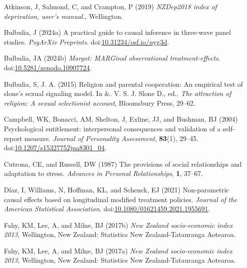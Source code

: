 \documentclass[
  singlecolumn]{article}
\newlength{\cslhangindent}
\newenvironment{CSLReferences}[2] %
 {\begin{list}{}{%
  \setlength{\itemindent}{0pt}
  \setlength{\leftmargin}{0pt}
  \setlength{\parsep}{0pt}
  \ifodd #1
   \setlength{\leftmargin}{\cslhangindent}
   \setlength{\itemindent}{-1\cslhangindent}
  \fi
  \setlength{\itemsep}{#2\baselineskip}}}
 {\end{list}}
\begin{document}
\label{refs}
\begin{CSLReferences}{1}{0}
Atkinson, J, Salmond, C, and Crampton, P (2019) \emph{NZDep2018 index of
deprivation, user{'}s manual.}, Wellington.

Bulbulia, J (2024a) A practical guide to causal inference in three-wave
panel studies. \emph{PsyArXiv Preprints}.
doi:\href{https://doi.org/10.31234/osf.io/uyg3d}{10.31234/osf.io/uyg3d}.

Bulbulia, JA (2024b) \emph{Margot: MARGinal observational
treatment-effects}.
doi:\href{https://doi.org/10.5281/zenodo.10907724}{10.5281/zenodo.10907724}.

Bulbulia, S, J. A. (2015) Religion and parental cooperation: An
empirical test of slone's sexual signaling model. In \&. V. S. J. Slone
D., ed., \emph{The attraction of religion: A sexual selectionist
account}, Bloomsbury Press, 29--62.

Campbell, WK, Bonacci, AM, Shelton, J, Exline, JJ, and Bushman, BJ
(2004) Psychological entitlement: interpersonal consequences and
validation of a self-report measure. \emph{Journal of Personality
Assessment}, \textbf{83}(1), 29--45.
doi:\href{https://doi.org/10.1207/s15327752jpa8301_04}{10.1207/s15327752jpa8301\_04}.

Cutrona, CE, and Russell, DW (1987) The provisions of social
relationships and adaptation to stress. \emph{Advances in Personal
Relationships}, \textbf{1}, 37--67.

Díaz, I, Williams, N, Hoffman, KL, and Schenck, EJ (2021) Non-parametric
causal effects based on longitudinal modified treatment policies.
\emph{Journal of the American Statistical Association}.
doi:\href{https://doi.org/10.1080/01621459.2021.1955691}{10.1080/01621459.2021.1955691}.

Fahy, KM, Lee, A, and Milne, BJ (2017b) \emph{New Zealand socio-economic
index 2013}, Wellington, New Zealand: Statistics New Zealand-Tatauranga
Aotearoa.

Fahy, KM, Lee, A, and Milne, BJ (2017a) \emph{New Zealand socio-economic
index 2013}, Wellington, New Zealand: Statistics New Zealand-Tatauranga
Aotearoa.


\end{CSLReferences}
\end{document}
